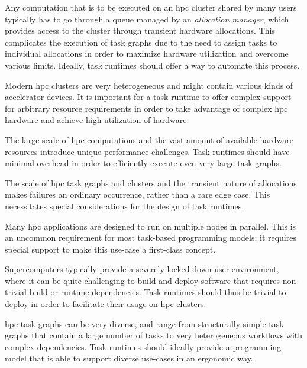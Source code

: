 \begin{description}[wide=0pt, itemsep=1pt]
	\item[Allocation manager] Any computation that is to be executed on an \gls{hpc} cluster shared by many users
		typically has to go through a queue managed by an \emph{allocation manager}, which provides access to
		the cluster through transient hardware allocations. This complicates the execution of task graphs
		due to the need to assign tasks to individual allocations in order to maximize hardware utilization
		and overcome various limits. Ideally, task runtimes should offer a way to automate this process.
	\item[Cluster heterogeneity] Modern \gls{hpc} clusters are very heterogeneous and might contain various kinds of
		accelerator devices. It is important for a task runtime to offer complex support for arbitrary
		resource requirements in order to take advantage of complex \gls{hpc} hardware and
		achieve high utilization of hardware.
	\item[Performance and scalability] The large scale of \gls{hpc} computations and the vast amount of available hardware
		resources introduce unique performance challenges. Task runtimes should have minimal overhead in
		order to efficiently execute even very large task graphs.
	\item[Fault tolerance] The scale of \gls{hpc} task graphs and clusters and the transient nature of allocations
		makes failures an ordinary occurrence, rather than a rare edge case. This necessitates special
		considerations for the design of task runtimes.
	\item[Multi-node tasks] Many \gls{hpc} applications are designed to run on multiple nodes in parallel. This is
		an uncommon requirement for most task-based programming models; it requires special support to make
		this use-case a first-class concept.
	\item[Deployment] Supercomputers typically provide a severely locked-down user environment, where it can be quite
		challenging to build and deploy software that requires non-trivial build or runtime dependencies.
		Task runtimes should thus be trivial to deploy in order to facilitate their usage on
		\gls{hpc} clusters.
	\item[Programming model] \gls{hpc} task graphs can be very diverse, and
		range from structurally simple task graphs that contain a large number of tasks to very
		heterogeneous workflows with complex dependencies. Task runtimes should ideally provide a
		programming model that is able to support diverse use-cases in an ergonomic way.
\end{description}

